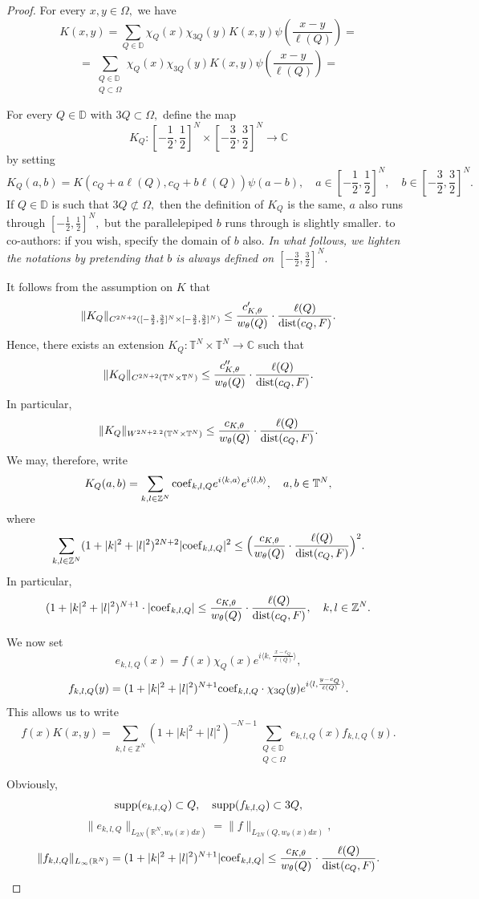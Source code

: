 \documentclass{amsart}
\begin{document}
\begin{proof} For every $x,y\in \Omega,$ we have
$$K(x,y)=\sum_{Q\in\mathbb{D}}\chi_Q(x)\chi_{3Q}(y)K(x,y)\psi(\frac{x-y}{\ell(Q)})=$$
$$=\sum_{\substack{Q\in\mathbb{D}\\ Q\subset\Omega}}\chi_Q(x)\chi_{3Q}(y)K(x,y)\psi(\frac{x-y}{\ell(Q)})=$$

For every $Q\in\mathbb{D}$ with $3Q\subset\Omega,$ define the map
$$K_Q:[-\frac12,\frac12]^N\times[-\frac32,\frac32]^N\to\mathbb{C}$$
by setting
$$K_Q(a,b)=K(c_Q+a\ell(Q),c_Q+b\ell(Q))\psi(a-b),\quad a\in [-\frac12,\frac12]^N,\quad b\in[-\frac32,\frac32]^N.$$
If $Q\in\mathbb{D}$ is such that $3Q\not\subset\Omega,$ then the definition of $K_Q$ is the same, $a$ also runs through $[-\frac12,\frac12]^N,$ but the parallelepiped $b$ runs through is slightly smaller. {\color{red} to co-authors: if you wish, specify the domain of $b$ also.} {\it In what follows, we lighten the notations by pretending that $b$ is always defined on $[-\frac32,\frac32]^N.$}

It follows from the assumption on $K$ that
$$\|K_Q\|_{C^{2N+2}([-\frac32,\frac32]^N\times[-\frac32,\frac32]^N)}\leq\frac{c_{K,\theta}'}{w_{\theta}(Q)}\cdot \frac{\ell(Q)}{{\rm dist}(c_Q,F)}.$$
Hence, there exists an extension $K_Q:\mathbb{T}^N\times\mathbb{T}^N\to\mathbb{C}$ such that
$$\|K_Q\|_{C^{2N+2}(\mathbb{T}^N\times\mathbb{T}^N)}\leq \frac{c_{K,\theta}''}{w_{\theta}(Q)}\cdot \frac{\ell(Q)}{{\rm dist}(c_Q,F)}.$$
In particular,
$$\|K_Q\|_{W^{2N+2.2}(\mathbb{T}^N\times\mathbb{T}^N)}\leq \frac{c_{K,\theta}}{w_{\theta}(Q)}\cdot \frac{\ell(Q)}{{\rm dist}(c_Q,F)}.$$
We may, therefore, write
$$K_Q(a,b)=\sum_{k,l\in\mathbb{Z}^N}{\rm coef}_{k,l,Q}e^{i\langle k,a\rangle}e^{i\langle l,b\rangle},\quad a,b\in\mathbb{T}^N,$$
where
$$\sum_{k,l\in\mathbb{Z}^N}(1+|k|^2+|l|^2)^{2N+2}|{\rm coef}_{k,l,Q}|^2\leq \Big(\frac{c_{K,\theta}}{w_{\theta}(Q)}\cdot \frac{\ell(Q)}{{\rm dist}(c_Q,F)}\Big)^2.$$
In particular,
$$(1+|k|^2+|l|^2)^{N+1}\cdot|{\rm coef}_{k,l,Q}|\leq \frac{c_{K,\theta}}{w_{\theta}(Q)}\cdot \frac{\ell(Q)}{{\rm dist}(c_Q,F)},\quad k,l\in\mathbb{Z}^N.$$

We now set
$$e_{k,l,Q}(x)=f(x)\chi_Q(x)e^{i\langle k,\frac{x-c_Q}{\ell(Q)}\rangle},$$
$$f_{k,l,Q}(y)=(1+|k|^2+|l|^2)^{N+1}{\rm coef}_{k,l,Q}\cdot \chi_{3Q}(y)e^{i\langle l,\frac{y-c_Q}{\ell(Q)}\rangle}.$$
This allows us to write
$$f(x)K(x,y)=\sum_{k,l\in\mathbb{Z}^N}(1+|k|^2+|l|^2)^{-N-1}\sum_{\substack{Q\in\mathbb{D}\\ Q\subset\Omega}}e_{k,l,Q}(x)f_{k,l,Q}(y).$$

Obviously,
$${\rm supp}(e_{k,l,Q})\subset Q,\quad {\rm supp}(f_{k,l,Q})\subset 3Q,$$
$$\|e_{k,l,Q}\|_{L_{2N}(\mathbb{R}^N,w_{\theta}(x)dx)}=\|f\|_{L_{2N}(Q,w_{\theta}(x)dx)},$$
$$\|f_{k,l,Q}\|_{L_{\infty}(\mathbb{R}^N)}=(1+|k|^2+|l|^2)^{N+1}|{\rm coef}_{k,l,Q}|\leq \frac{c_{K,\theta}}{w_{\theta}(Q)}\cdot \frac{\ell(Q)}{{\rm dist}(c_Q,F)}.$$
\end{proof}
\end{document}
